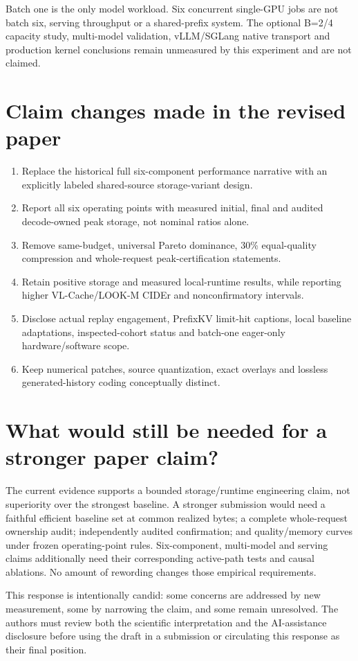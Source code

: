 \documentclass[11pt]{article}
\begin{document}
Batch one is the only model workload. Six concurrent single-GPU jobs
are not batch six, serving throughput or a shared-prefix system. The
optional B=2/4 capacity study, multi-model validation, vLLM/SGLang native
transport and production kernel conclusions remain unmeasured by this
experiment and are not claimed.

\section{Claim changes made in the revised paper}
\begin{enumerate}
\item Replace the historical full six-component performance narrative with
      an explicitly labeled shared-source storage-variant design.
\item Report all six operating points with measured initial, final and
      audited decode-owned peak storage, not nominal ratios alone.
\item Remove same-budget, universal Pareto dominance, 30\% equal-quality
      compression and whole-request peak-certification statements.
\item Retain positive storage and measured local-runtime results, while
      reporting higher VL-Cache/LOOK-M CIDEr and nonconfirmatory intervals.
\item Disclose actual replay engagement, PrefixKV limit-hit captions,
      local baseline adaptations, inspected-cohort status and batch-one
      eager-only hardware/software scope.
\item Keep numerical patches, source quantization, exact overlays and
      lossless generated-history coding conceptually distinct.
\end{enumerate}

\section{What would still be needed for a stronger paper claim?}
The current evidence supports a bounded storage/runtime engineering claim,
not superiority over the strongest baseline. A stronger submission would
need a faithful efficient baseline set at common realized bytes; a complete
whole-request ownership audit; independently audited confirmation; and
quality/memory curves under frozen operating-point rules. Six-component,
multi-model and serving claims additionally need their corresponding
active-path tests and causal ablations. No amount of rewording changes
those empirical requirements.

This response is intentionally candid: some concerns are addressed by new
measurement, some by narrowing the claim, and some remain unresolved.
The authors must review both the scientific interpretation and the
AI-assistance disclosure before using the draft in a submission or
circulating this response as their final position.



\end{document}
